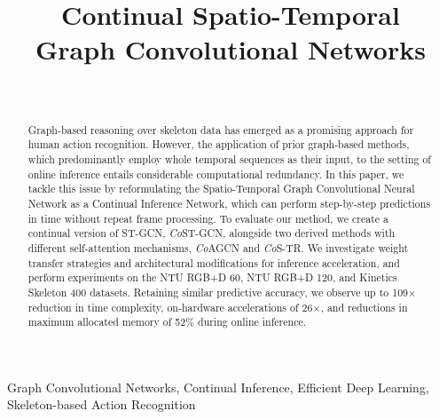 \documentclass[journal]{IEEEtran}
\theoremstyle{definition}
\begin{document}
\title{Continual Spatio-Temporal\\Graph Convolutional Networks}





\author{
    \\
}





\maketitle





\begin{abstract}
Graph-based reasoning over skeleton data has emerged as a promising approach for human action recognition.
However, the application of prior graph-based methods, which predominantly employ whole temporal sequences as their input, to the setting of online inference entails considerable computational redundancy.
In this paper, we tackle this issue by reformulating the Spatio-Temporal Graph Convolutional Neural Network as a Continual Inference Network, which can perform step-by-step predictions in time without repeat frame processing.
To evaluate our method, we create a continual version of ST-GCN, \textit{Co}ST-GCN, alongside two derived methods with different self-attention mechanisms, \textit{Co}AGCN and \textit{Co}S-TR. We investigate weight transfer strategies and architectural modifications for inference acceleration, and perform experiments on the NTU RGB+D 60, NTU RGB+D 120, and Kinetics Skeleton 400 datasets. Retaining similar predictive accuracy, we observe up to 109$\times$ reduction in time complexity, on-hardware accelerations of 26$\times$, and reductions in maximum allocated memory of 52\% during online inference.
\end{abstract}

%
 
\begin{IEEEkeywords}
Graph Convolutional Networks, Continual Inference, Efficient Deep Learning, Skeleton-based Action Recognition
\end{IEEEkeywords}
\end{document}
